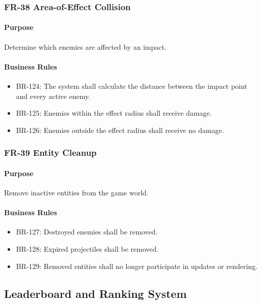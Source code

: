 \documentclass[11pt,a4paper]{article}
\begin{document}
\subsubsection{FR-38 Area-of-Effect Collision}

\paragraph{Purpose}
Determine which enemies are affected by an impact.

\paragraph{Business Rules}
\begin{itemize}
  \item BR-124: The system shall calculate the distance between the impact point
        and every active enemy.
  \item BR-125: Enemies within the effect radius shall receive damage.
  \item BR-126: Enemies outside the effect radius shall receive no damage.
\end{itemize}

\subsubsection{FR-39 Entity Cleanup}

\paragraph{Purpose}
Remove inactive entities from the game world.

\paragraph{Business Rules}
\begin{itemize}
  \item BR-127: Destroyed enemies shall be removed.
  \item BR-128: Expired projectiles shall be removed.
  \item BR-129: Removed entities shall no longer participate in updates or
        rendering.
\end{itemize}

\subsection{Leaderboard and Ranking System}
\end{document}
